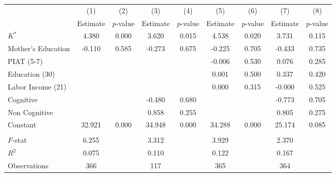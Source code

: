 \begin{tabular}{lcccccccc} \toprule
 & (1) & (2) & (3) & (4) & (5) & (6) & (7) & (8) \\
 & Estimate  & $p$-value  & Estimate  & $p$-value  & Estimate  & $p$-value  & Estimate  & $p$-value  \\  \midrule
$K^\ast$ &     4.380 &     0.000 &     3.620 &     0.015 &     4.538 &     0.020 &     3.731 &     0.115 \\
Mother's Education &    -0.110 &     0.585 &    -0.273 &     0.675 &    -0.225 &     0.705 &    -0.433 &     0.735 \\
PIAT (5-7) &         &         &         &         &    -0.006 &     0.530 &     0.076 &     0.285 \\
Education (30) &         &         &         &         &     0.001 &     0.500 &     0.337 &     0.420 \\
Labor Income (21) &         &         &         &         &     0.000 &     0.315 &    -0.000 &     0.525 \\
Cognitive &         &         &    -0.480 &     0.680 &         &         &    -0.773 &     0.705 \\
Non Cognitive &         &         &     0.858 &     0.255 &         &         &     0.805 &     0.275 \\
Constant &    32.921 &     0.000 &    34.948 &     0.000 &    34.288 &     0.000 &    25.174 &     0.085 \\  \\ \midrule
$F$-stat &     6.255 &         &     3.312 &         &     3.929 &         &     2.370 &         \\
$R^2$ &     0.075 &         &     0.110 &         &     0.122 &         &     0.167 &         \\
Observations &   366 &         &   117 &         &   365 &         &   364 &         \\
\bottomrule \end{tabular}
